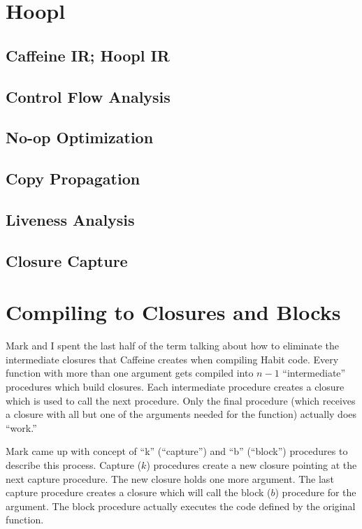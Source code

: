 \documentclass[11pt]{article}
\begin{document}
\doublespacing
{}
\DefineShortVerb{\|}
\VerbatimFootnotes
\DefineShortVerb{\#}

\section*{Hoopl}

\subsection*{Caffeine IR; Hoopl IR}

\subsection*{Control Flow Analysis}
\subsection*{No-op Optimization}
\subsection*{Copy Propagation}
\subsection*{Liveness Analysis}
\subsection*{Closure Capture}

\section*{Compiling to Closures and Blocks}

Mark and I spent the last half of the term talking about how to eliminate
the intermediate closures that Caffeine creates when compiling Habit code. Every function
with more than one argument gets compiled into $n - 1$ ``intermediate'' procedures which
build closures. Each intermediate procedure creates a closure which is used to call
the next procedure. Only the final procedure (which receives a closure with all but one of
the arguments needed for the function) actually does ``work.'' 

Mark came up with concept of ``k'' (``capture'') and ``b'' (``block'')
procedures to describe this process. Capture ($k$) procedures create a
new closure pointing at the next capture procedure. The new closure
holds one more argument. The last capture procedure creates a closure
which will call the block ($b$) procedure for the argument. The block
procedure actually executes the code defined by the original function.
\end{document}
